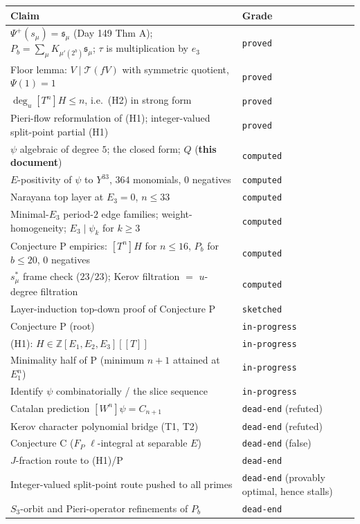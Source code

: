 \documentclass[11pt,a4paper]{article}
\newcommand{\Ztwo}{\mathbb{Z}}
\theoremstyle{plain}
\theoremstyle{definition}
\begin{document}
\begin{center}
\small
\sloppy\begin{longtable}{@{}p{}|p{}@{}}
\toprule
\textbf{Claim} & \textbf{Grade}\\
\midrule
\endhead
$\Psi^+(s_\mu)=\mathfrak s_\mu$ (Day 149 Thm A); $P_b=\sum_\mu K_{\mu'(2^b)}\mathfrak s_\mu$; $\tau$ is multiplication by $e_3$ & \texttt{proved}\\
Floor lemma: $V\mid \mathcal T(fV)$ with symmetric quotient, $\Psi(1)=1$ & \texttt{proved}\\
$\deg_u[T^n]H\le n$, i.e.\ (H2) in strong form & \texttt{proved}\\
Pieri-flow reformulation of (H1); integer-valued split-point partial (H1) & \texttt{proved}\\
\midrule
$\psi$ algebraic of degree $5$; the closed form; $Q$ (\textbf{this document}) & \texttt{computed}\\
$E$-positivity of $\psi$ to $Y^{33}$, $364$ monomials, $0$ negatives & \texttt{computed}\\
Narayana top layer at $E_3=0$, $n\le33$ & \texttt{computed}\\
Minimal-$E_3$ period-$2$ edge families; weight-homogeneity; $E_3\mid\psi_k$ for $k\ge3$ & \texttt{computed}\\
Conjecture P empirics: $[T^n]H$ for $n\le16$, $P_b$ for $b\le20$, $0$ negatives & \texttt{computed}\\
$s^*_\mu$ frame check ($23/23$); Kerov filtration $=$ $u$-degree filtration & \texttt{computed}\\
\midrule
Layer-induction top-down proof of Conjecture P & \texttt{sketched}\\
Conjecture P (root) & \texttt{in-progress}\\
(H1): $H\in\Ztwo[E_1,E_2,E_3][[T]]$ & \texttt{in-progress}\\
Minimality half of P (minimum $n+1$ attained at $E_1^n$) & \texttt{in-progress}\\
Identify $\psi$ combinatorially / the slice sequence & \texttt{in-progress}\\
\midrule
Catalan prediction $[W^n]\psi=C_{n+1}$ & \texttt{dead-end} (refuted)\\
Kerov character polynomial bridge (T1, T2) & \texttt{dead-end} (refuted)\\
Conjecture C ($F_P$ $\ell$-integral at separable $E$) & \texttt{dead-end} (false)\\
$J$-fraction route to (H1)/P & \texttt{dead-end}\\
Integer-valued split-point route pushed to all primes & \texttt{dead-end} (provably optimal, hence stalls)\\
$S_3$-orbit and Pieri-operator refinements of $P_b$ & \texttt{dead-end}\\
\bottomrule
\end{longtable}
\end{center}
\end{document}
